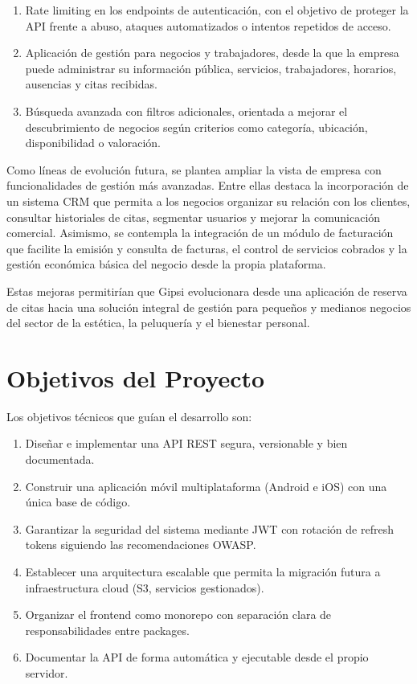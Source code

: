 \documentclass[12pt,a4paper,twoside]{report}
\begin{document}
\begin{enumerate}
  \item Rate limiting en los endpoints de autenticación, con el objetivo de proteger la API frente a abuso, ataques automatizados o intentos repetidos de acceso.

  \item Aplicación de gestión para negocios y trabajadores, desde la que la empresa puede administrar su información pública, servicios, trabajadores, horarios, ausencias y citas recibidas.

  \item Búsqueda avanzada con filtros adicionales, orientada a mejorar el descubrimiento de negocios según criterios como categoría, ubicación, disponibilidad o valoración.
\end{enumerate}

Como líneas de evolución futura, se plantea ampliar la vista de empresa con funcionalidades de gestión más avanzadas. Entre ellas destaca la incorporación de un sistema CRM que permita a los negocios organizar su relación con los clientes, consultar historiales de citas, segmentar usuarios y mejorar la comunicación comercial. Asimismo, se contempla la integración de un módulo de facturación que facilite la emisión y consulta de facturas, el control de servicios cobrados y la gestión económica básica del negocio desde la propia plataforma.

Estas mejoras permitirían que Gipsi evolucionara desde una aplicación de reserva de citas hacia una solución integral de gestión para pequeños y medianos negocios del sector de la estética, la peluquería y el bienestar personal.

\section{Objetivos del Proyecto}

Los objetivos técnicos que guían el desarrollo son:

\begin{tcolorbox}[definicionStyle, title={Objetivos Técnicos}]
\begin{enumerate}[label=\textbf{OT\arabic*.}]
  \item Diseñar e implementar una API REST segura, versionable y bien documentada.
  \item Construir una aplicación móvil multiplataforma (Android e iOS) con una única base de código.
  \item Garantizar la seguridad del sistema mediante JWT con rotación de refresh tokens siguiendo las recomendaciones OWASP.
  \item Establecer una arquitectura escalable que permita la migración futura a infraestructura cloud (S3, servicios gestionados).
  \item Organizar el frontend como monorepo con separación clara de responsabilidades entre packages.
  \item Documentar la API de forma automática y ejecutable desde el propio servidor.
\end{enumerate}
\end{tcolorbox}
\end{document}
